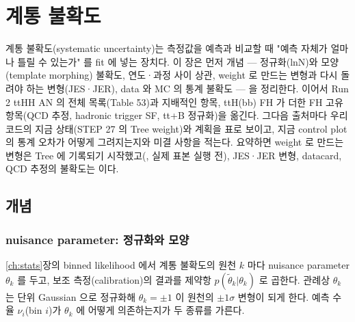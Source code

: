 \chapter{계통 불확도}\label{ch:syst}

계통 불확도(systematic uncertainty)는 측정값을 예측과 비교할 때 "예측 자체가 얼마나 틀릴 수 있는가" 를 fit 에 넣는 장치다. 이 장은 먼저 개념 —
정규화(lnN)와 모양(template morphing) 불확도, 연도·과정 사이 상관, weight 로 만드는 변형과 다시 돌려야 하는 변형(JES·JER), data 와 MC 의 통계
불확도 — 을 정리한다. 이어서 Run 2 ttHH AN 의 전체 목록(Table 53)과 지배적인 항목, ttH(bb) FH 가 더한 FH 고유 항목(QCD 추정, hadronic trigger SF,
tt+B 정규화)을 옮긴다. 그다음 출처마다 우리 코드의 지금 상태(STEP 27 의 Tree weight)와 계획을 표로 보이고, 지금 control plot 의 통계 오차가
어떻게 그려지는지와 미결 사항을 적는다. 요약하면 weight 로 만드는 변형은 Tree 에 기록되기 시작했고(\tagimpl\tagtest, 실제 표본 실행 전),
JES·JER 변형, datacard, QCD 추정의 불확도는 \tagplan 이다.

\section{개념}\label{sec:syst-concepts}

\subsection{nuisance parameter: 정규화와 모양}\label{sec:syst-np}

\ref{ch:stats}장의 binned likelihood 에서 계통 불확도의 원천 $k$ 마다 nuisance parameter $\theta_k$ 를 두고, 보조 측정(calibration)의 결과를
제약항 $p(\tilde\theta_k|\theta_k)$ 로 곱한다. 관례상 $\theta_k$ 는 단위 Gaussian 으로 정규화해 $\theta_k=\pm1$ 이 원천의 $\pm1\sigma$ 변형이 되게 한다.
예측 수율 $\nu_i$(bin $i$)가 $\theta_k$ 에 어떻게 의존하는지가 두 종류를 가른다.


